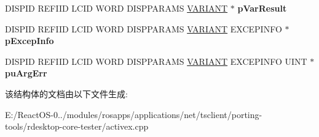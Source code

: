 \begin{DoxyCompactItemize}
\mbox{\label{struct_m_s_t_s_c_lib_1_1_i_ms_tsc_ax_events_vtbl_ab0e6c9b1c45743276ad4c5ae15a1264b}} 
D\+I\+S\+P\+ID R\+E\+F\+I\+ID L\+C\+ID W\+O\+RD D\+I\+S\+P\+P\+A\+R\+A\+MS \hyperlink{structtag_v_a_r_i_a_n_t}{V\+A\+R\+I\+A\+NT} $\ast$ {\bfseries p\+Var\+Result}
\item 
\mbox{\label{struct_m_s_t_s_c_lib_1_1_i_ms_tsc_ax_events_vtbl_abfafb23b065373644c2dba7582543d54}} 
D\+I\+S\+P\+ID R\+E\+F\+I\+ID L\+C\+ID W\+O\+RD D\+I\+S\+P\+P\+A\+R\+A\+MS \hyperlink{structtag_v_a_r_i_a_n_t}{V\+A\+R\+I\+A\+NT} E\+X\+C\+E\+P\+I\+N\+FO $\ast$ {\bfseries p\+Excep\+Info}
\item 
\mbox{\label{struct_m_s_t_s_c_lib_1_1_i_ms_tsc_ax_events_vtbl_a36a9bc3c33fe034267661b24e183fd8b}} 
D\+I\+S\+P\+ID R\+E\+F\+I\+ID L\+C\+ID W\+O\+RD D\+I\+S\+P\+P\+A\+R\+A\+MS \hyperlink{structtag_v_a_r_i_a_n_t}{V\+A\+R\+I\+A\+NT} E\+X\+C\+E\+P\+I\+N\+FO U\+I\+NT $\ast$ {\bfseries pu\+Arg\+Err}
\end{DoxyCompactItemize}


该结构体的文档由以下文件生成\+:\begin{DoxyCompactItemize}
\item 
E\+:/\+React\+O\+S-\/0../modules/rosapps/applications/net/tsclient/porting-\/tools/rdesktop-\/core-\/tester/activex.\+cpp\end{DoxyCompactItemize}
